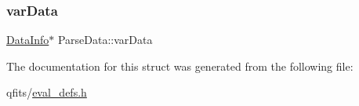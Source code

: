 \subsubsection{\texorpdfstring{var\+Data}{varData}}
{\footnotesize\ttfamily \hyperlink{struct_data_info}{Data\+Info}$\ast$ Parse\+Data\+::var\+Data}



The documentation for this struct was generated from the following file\+:\begin{DoxyCompactItemize}
\item 
qfits/\hyperlink{eval__defs_8h}{eval\+\_\+defs.\+h}\end{DoxyCompactItemize}
